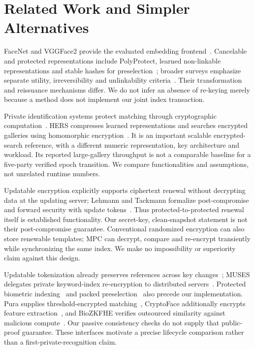 \documentclass[journal]{IEEEtran}
\begin{document}
\section{Related Work and Simpler Alternatives}\label{sec:related}
FaceNet and VGGFace2 provide the evaluated embedding frontend~\cite{schroff2015facenet,cao2018vggface2}. Cancelable and protected representations include PolyProtect, learned non-linkable representations and stable hashes for preselection~\cite{hahn2022polyprotect,pinto2021securetriplet,osorioroig2022stablehash}; broader surveys emphasize separate utility, irreversibility and unlinkability criteria~\cite{krivokuca2023survey}. Their transformation and reissuance mechanisms differ. We do not infer an absence of re-keying merely because a method does not implement our joint index transaction.

Private identification systems protect matching through cryptographic computation~\cite{franz2009privacyface,osadchy2010scifi}. HERS compresses learned representations and searches encrypted galleries using homomorphic encryption~\cite{engelsma2022hers}. It is an important scalable encrypted-search reference, with a different numeric representation, key architecture and workload. Its reported large-gallery throughput is not a comparable baseline for a five-party verified epoch transition. We compare functionalities and assumptions, not unrelated runtime numbers.

Updatable encryption explicitly supports ciphertext renewal without decrypting data at the updating server; Lehmann and Tackmann formalize post-compromise and forward security with update tokens~\cite{lehmann2018updatable}. Thus protected-to-protected renewal itself is established functionality. Our secret-key, clean-snapshot statement is not their post-compromise guarantee. Conventional randomized encryption can also store renewable templates; MPC can decrypt, compare and re-encrypt transiently while synchronizing the same index. We make no impossibility or superiority claim against this design.

Updatable tokenization already preserves references across key changes~\cite{cachin2017tokenization}; MUSES delegates private keyword-index re-encryption to distributed servers~\cite{le2024muses}. Protected biometric indexing~\cite{drozdowski2021fusion} and packed preselection~\cite{xin2026pfip} also precede our implementation. Pura supplies threshold-encrypted matching~\cite{xu2025pura}, CryptoFace additionally encrypts feature extraction~\cite{ao2025cryptoface}, and BioZKFHE verifies outsourced similarity against malicious compute~\cite{xin2026biozkfhe}. Our passive consistency checks do not supply that public-proof guarantee. These interfaces motivate a precise lifecycle comparison rather than a first-private-recognition claim.
\end{document}
